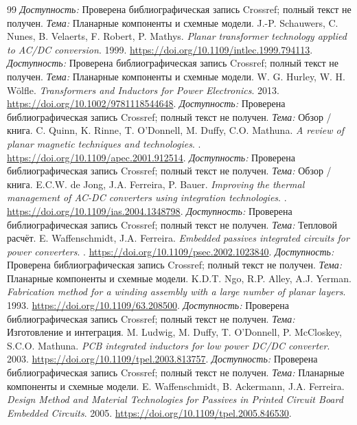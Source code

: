 \documentclass[14pt,a4paper]{extarticle}
\begin{document}
\begin{thebibliography}{99}
\textit{Доступность:} Проверена библиографическая запись Crossref; полный текст не получен. \textit{Тема:} Планарные компоненты и схемные модели.
J.-P. Schauwers, C. Nunes, B. Velaerts, F. Robert, P. Mathys. \textit{Planar transformer technology applied to AC/DC conversion}. 1999.
\url{https://doi.org/10.1109/intlec.1999.794113}.
\textit{Доступность:} Проверена библиографическая запись Crossref; полный текст не получен. \textit{Тема:} Планарные компоненты и схемные модели.
W. G. Hurley, W. H. Wölfle. \textit{Transformers and Inductors for Power Electronics}. 2013.
\url{https://doi.org/10.1002/9781118544648}.
\textit{Доступность:} Проверена библиографическая запись Crossref; полный текст не получен. \textit{Тема:} Обзор / книга.
C. Quinn, K. Rinne, T. O'Donnell, M. Duffy, C.O. Mathuna. \textit{A review of planar magnetic techniques and technologies}. .
\url{https://doi.org/10.1109/apec.2001.912514}.
\textit{Доступность:} Проверена библиографическая запись Crossref; полный текст не получен. \textit{Тема:} Обзор / книга.
E.C.W. de Jong, J.A. Ferreira, P. Bauer. \textit{Improving the thermal management of AC-DC converters using integration technologies}. .
\url{https://doi.org/10.1109/ias.2004.1348798}.
\textit{Доступность:} Проверена библиографическая запись Crossref; полный текст не получен. \textit{Тема:} Тепловой расчёт.
E. Waffenschmidt, J.A. Ferreira. \textit{Embedded passives integrated circuits for power converters}. .
\url{https://doi.org/10.1109/psec.2002.1023840}.
\textit{Доступность:} Проверена библиографическая запись Crossref; полный текст не получен. \textit{Тема:} Планарные компоненты и схемные модели.
K.D.T. Ngo, R.P. Alley, A.J. Yerman. \textit{Fabrication method for a winding assembly with a large number of planar layers}. 1993.
\url{https://doi.org/10.1109/63.208500}.
\textit{Доступность:} Проверена библиографическая запись Crossref; полный текст не получен. \textit{Тема:} Изготовление и интеграция.
M. Ludwig, M. Duffy, T. O'Donnell, P. McCloskey, S.C.O. Mathuna. \textit{PCB integrated inductors for low power DC/DC converter}. 2003.
\url{https://doi.org/10.1109/tpel.2003.813757}.
\textit{Доступность:} Проверена библиографическая запись Crossref; полный текст не получен. \textit{Тема:} Планарные компоненты и схемные модели.
E. Waffenschmidt, B. Ackermann, J.A. Ferreira. \textit{Design Method and Material Technologies for Passives in Printed Circuit Board Embedded Circuits}. 2005.
\url{https://doi.org/10.1109/tpel.2005.846530}.

\end{thebibliography}
\end{document}
